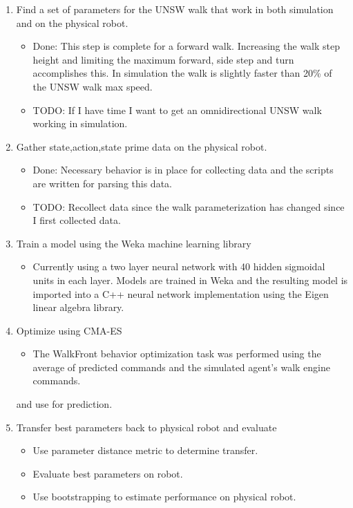 \documentclass[12 pt]{article}
\begin{document}
\begin{enumerate}


\item Find a set of parameters for the UNSW walk that work in both simulation and on the physical robot.
\begin{itemize}
\item Done: This step is complete for a forward walk. Increasing the walk step height and limiting the maximum forward, side step and turn accomplishes this. In simulation the walk is slightly faster than 20\% of the UNSW walk max speed.
\item TODO: If I have time I want to get an omnidirectional UNSW walk working in simulation.
\end{itemize}

\item Gather state,action,state prime data on the physical robot.
\begin{itemize}
\item Done: Necessary behavior is in place for collecting data and the scripts are written for parsing this data.
\item TODO: Recollect data since the walk parameterization has changed since I first collected data.
\end{itemize}

\item Train a model using the Weka machine learning library
\begin{itemize}
\item Currently using a two layer neural network with 40 hidden sigmoidal units in each layer. Models are trained in Weka and the resulting model is imported into a C++ neural network implementation using the Eigen linear algebra library.
\end{itemize}

\item Optimize using CMA-ES
\begin{itemize}
\item The WalkFront behavior optimization task was performed using the average of predicted commands and the simulated agent's walk engine commands.
\end{itemize}and use for prediction.

\item Transfer best parameters back to physical robot and evaluate
\begin{itemize}
\item Use parameter distance metric to determine transfer.
\item Evaluate best parameters on robot.
\item Use bootstrapping to estimate performance on physical robot.
\end{itemize}

\end{enumerate}
\end{document}
